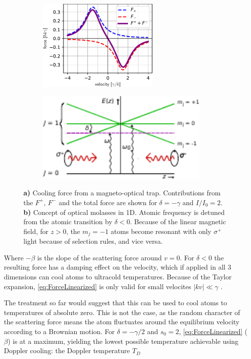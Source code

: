 \begin{figure}
	\begin{subfigure}{.44\textwidth}
		\includegraphics[height=4.5cm]{figures/MOTplot.pdf}
		\caption{}
		\label{fig:MOTcooling}
	\end{subfigure}
	\hfill
	\begin{subfigure}{.55\textwidth}
		\includegraphics[height=4.5cm]{figures/OpticalMolasses.pdf}
		\caption{}
		\label{fig:MOTconcept}
	\end{subfigure}
	\caption{\textbf{a)} Cooling force from a magneto-optical trap. 
	Contributions from the $F^+$, $F^-$ and the total force are shown for $\delta = -\gamma$ and $I/I_0 = 2.$ 
	\textbf{b)} Concept of optical molasses in 1D. 
	Atomic frequency is detuned from the atomic transition by $\delta<0$.
	Because of the linear magnetic field, for $z>0$, the $m_j=-1$ atoms become resonant with only $\sigma^+$ light because of selection rules, and vice versa.}
	\label{fig:MOTPlots}
\end{figure}

Where $-\beta$ is the slope of the scattering force around $v=0$. 
For $\delta<0$ the resulting force has a damping effect on the velocity, which if applied in all 3 dimensions can cool atoms to ultracold temperatures. 
Because of the Taylor expansion, \cref{eq:ForceLinearized} is only valid for small velocites $|kv| \ll \gamma$ \cite{Kowalski2010}.

The treatment so far would suggest that this can be used to cool atoms to temperatures of absolute zero. 
This is not the case, as the random character of the scattering force means the atom fluctuates around the equilibrium velocity according to a Brownian motion. 
For $\delta=-\gamma/2$ and $s_0 =2$, \cref{eq:ForceLinearized} ($\beta$) is at a maximum, yielding the lowest possible temperature achievable using Doppler cooling: the Doppler temperature $T_D$ \cite{Metcalf1999}

